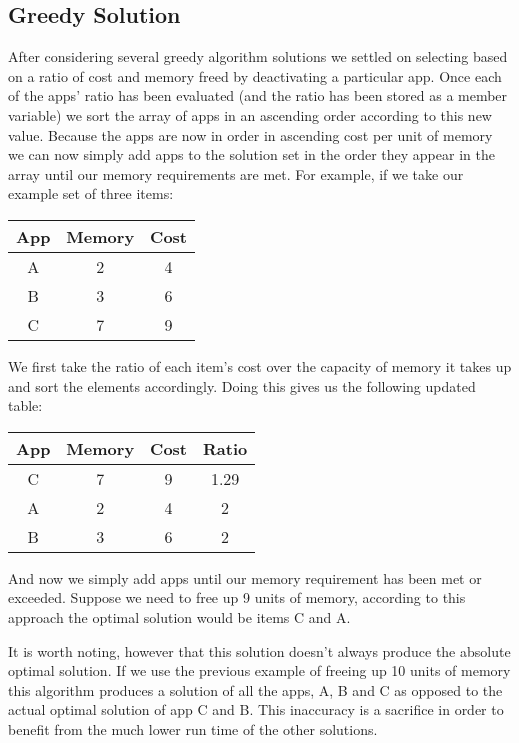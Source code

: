 \documentclass{article}
\begin{document}
\subsection{Greedy Solution}
After considering several greedy algorithm solutions we settled on selecting based on a ratio of cost and memory freed by deactivating a particular app. Once each of the apps’ ratio has been evaluated (and the ratio has been stored as a member variable) we sort the array of apps in an ascending order according to this new value. Because the apps are now in order in ascending cost per unit of memory we can now simply add apps to the solution set in the order they appear in the array until our memory requirements are met. For example, if we take our example set of three items:

\begin{center}
    \begin{tabular}{|c|c|c|}
        \hline
        App & Memory & Cost \\ \hline
        A & 2 & 4 \\
        B & 3 & 6 \\
        C & 7 & 9 \\
        \hline
    \end{tabular}
\end{center}

We first take the ratio of each item’s cost over the capacity of memory it takes up and sort the elements accordingly. Doing this gives us the following updated table:

\begin{center}
    \begin{tabular}{|c|c|c|c|}
        \hline
        App & Memory & Cost & Ratio \\ \hline
        C & 7 & 9 & 1.29 \\
        A & 2 & 4 & 2 \\
        B & 3 & 6 & 2 \\
        \hline
    \end{tabular}
\end{center}

And now we simply add apps until our memory requirement has been met or exceeded. Suppose we need to free up 9 units of memory, according to this approach the optimal solution would be items C and A.

It is worth noting, however that this solution doesn’t always produce the absolute optimal solution. If we use the previous example of freeing up 10 units of memory this algorithm produces a solution of all the apps, A, B and C as opposed to the actual optimal solution of app C and B.  This inaccuracy is a sacrifice in order to benefit from the much lower run time of the other solutions.
\end{document}
